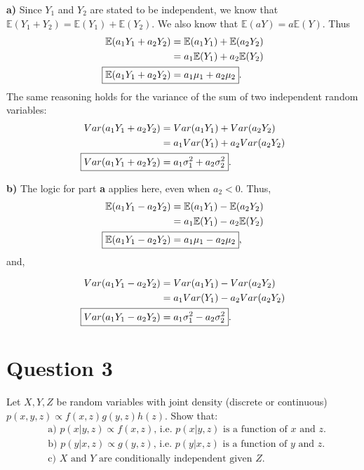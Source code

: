 \documentclass[titlepage, 12pt, leqno]{article}
\begin{document}
\textbf{a)} Since $Y_1$ and $Y_2$ are stated to be independent, we know that
$ \mathbb{E}(Y_1 + Y_2) = \mathbb{E}(Y_1) + \mathbb{E}(Y_2)$. We also know that
$ \mathbb{E}(aY) = a \mathbb{E}(Y)$. Thus
\begin{align*}
    \mathbb{E}(a_1Y_1 + a_2Y_2) &= \mathbb{E}(a_1Y_1) + \mathbb{E}(a_2Y_2) \\
                               &= a_1 \mathbb{E}(Y_1) + a_2 \mathbb{E}(Y_2) \\
    \Aboxed{\mathbb{E}(a_1Y_1 + a_2Y_2) &= a_1\mu_1 + a_2\mu_2}.
\end{align*}
The same reasoning holds for the variance of the sum of two independent random
variables:
\begin{align*}
    Var(a_1Y_1 + a_2Y_2) &= Var(a_1Y_1) + Var(a_2Y_2) \\
                         &= a_1Var(Y_1) + a_2Var(a_2Y_2) \\
    \Aboxed{Var(a_1Y_1 + a_2Y_2) &= a_1\sigma_1^{2} + a_2\sigma_2^{2}}.
\end{align*}

\textbf{b)} The logic for part \textbf{a} applies here, even when $a_2 < 0$. Thus,
\begin{align*}
    \mathbb{E}(a_1Y_1 - a_2Y_2) &= \mathbb{E}(a_1Y_1) - \mathbb{E}(a_2Y_2) \\
                               &= a_1 \mathbb{E}(Y_1) - a_2 \mathbb{E}(Y_2) \\
    \Aboxed{\mathbb{E}(a_1Y_1 - a_2Y_2) &= a_1\mu_1 - a_2\mu_2},
\end{align*}
and,

\begin{align*}
    Var(a_1Y_1 - a_2Y_2) &= Var(a_1Y_1) - Var(a_2Y_2) \\
                         &= a_1Var(Y_1) - a_2Var(a_2Y_2) \\
    \Aboxed{Var(a_1Y_1 - a_2Y_2) &= a_1\sigma_1^{2} - a_2\sigma_2^{2}}.
\end{align*}

\pagebreak
\section{Question 3}
\begin{ex}
    Let $X,Y,Z$ be random variables with joint density (discrete or continuous)
    $p(x,y,z) \propto f(x,z)g(y,z)h(z)$. Show that:
    \begin{align*}
        & \text{a) } p(x|y,z) \propto f(x,z) \text{, i.e. } p(x|y,z) \text{ is
        a function of $x$ and $z$}. \\
        & \text{b) } p(y|x,z) \propto g(y,z) \text{, i.e. } p(y|x,z) \text{ is
        a function of $y$ and $z$}. \\
        & \text{c) $X$ and $Y$ are conditionally independent given $Z$}.
    \end{align*}
\end{ex}
\end{document}
